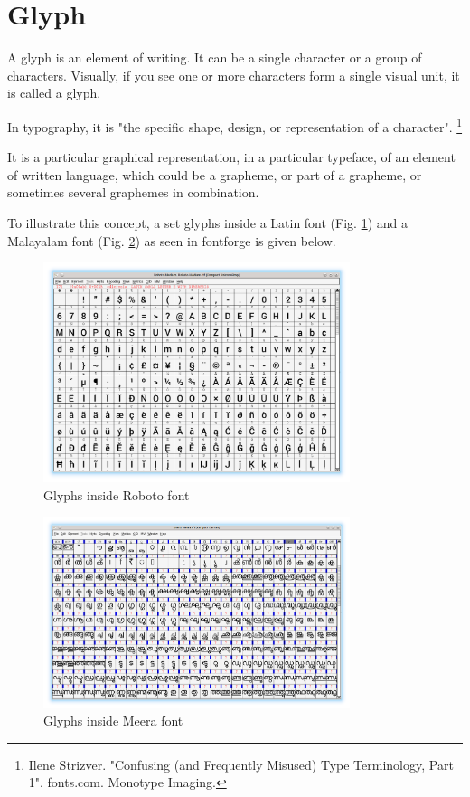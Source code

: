 \section{Glyph }

A glyph is an element of writing. It can be a single character or a group of
characters.
Visually, if you see one or more characters form a single visual unit, it is
called a glyph.

In typography, it is "the specific shape, design, or representation of a
character".
\footnote{Ilene Strizver. "Confusing (and Frequently Misused) Type Terminology,
Part 1". fonts.com. Monotype Imaging.}

It is a particular graphical representation, in a particular typeface, of an
element of written language, which could be a grapheme, or part of a grapheme,
or sometimes several graphemes in combination.

To illustrate this concept, a set glyphs inside a Latin font (Fig.
\ref{Robotoglyph}) and a Malayalam font  (Fig. \ref{Meeraglyph}) as seen in
fontforge is given below.

\begin{figure}[h]
    \centering
    \includegraphics[width=0.8\textwidth]{images/glyph-fontforge-roboto.png}
    \caption{Glyphs inside Roboto font}
	\label{Robotoglyph}
\end{figure}

\begin{figure}[h]
    \centering
    \includegraphics[width=0.8\textwidth]{images/glyph-fontforge-meera.png}
    \caption{Glyphs inside Meera font}
	\label{Meeraglyph}
\end{figure}

